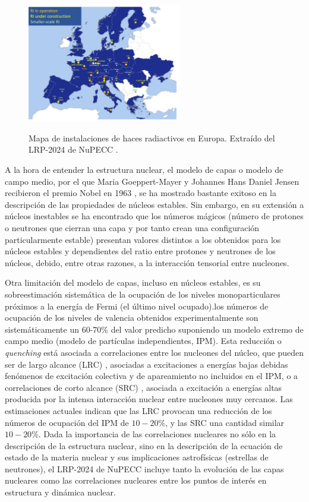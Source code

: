 \documentclass[a4paper,12pt,twoside]{article}
\begin{document}
\begin{figure}
\begin{center}
\includegraphics[width=0.6\textwidth]{EuRI.png}
\label{fig:euri}
\caption{Mapa de instalaciones de haces radiactivos en Europa. Extraído del LRP-2024 de NuPECC \cite{nupecc}.}
\end{center}
\end{figure}


A la hora de entender la estructura nuclear, el modelo de capas o modelo de campo medio, por el que Maria Goeppert-Mayer y Johannes Hans Daniel Jensen recibieron el premio Nobel en 1963 \cite{Goe49}, se ha mostrado bastante exitoso en la descripción de las propiedades de núcleos estables. Sin embargo, en su extensión a núcleos inestables se ha encontrado que los números mágicos (número de protones o neutrones que cierran una capa y por tanto crean una configuración particularmente estable) presentan valores distintos a los obtenidos para los núcleos estables y dependientes del ratio entre protones y neutrones de los núcleos, debido, entre otras razones, a la interacción tensorial entre nucleones\cite{Ots20}. 

Otra limitación del modelo de capas, incluso en núcleos estables, es su sobreestimación sistemática de la ocupación de los niveles monoparticulares próximos a la energía de Fermi (el último nivel ocupado).los números de ocupación de los niveles de valencia obtenidos experimentalmente son sistemáticamente un 60-70\% \cite{Pan97} del valor predicho suponiendo un modelo extremo de campo medio (modelo de partículas independientes, IPM). Esta reducción o \textit{quenching} está asociada a correlaciones entre los nucleones del núcleo, que pueden ser de largo alcance (LRC) \cite{Bar09}, asociadas a excitaciones a energías bajas debidas fenómenos de excitación colectiva y de apareamiento no incluidos en el IPM, o a correlaciones de corto alcance (SRC) \cite{Sub08}, asociada a excitación a energías altas producida por la intensa interacción nuclear entre nucleones muy cercanos. Las estimaciones actuales indican que las LRC provocan una reducción de los números de ocupación del IPM de $10-20\%$, y las SRC una cantidad similar $10-20\%$. Dada la importancia de las correlaciones nucleares no sólo en la descripción de la estructura nuclear, sino en la descripción de la ecuación de estado de la materia nuclear y sus implicaciones astrofísicas (estrellas de neutrones), el LRP-2024 de NuPECC \cite{nupecc} incluye tanto la evolución de las capas nucleares como las correlaciones nucleares entre los puntos de interés en estructura y dinámica nuclear.
\end{document}

